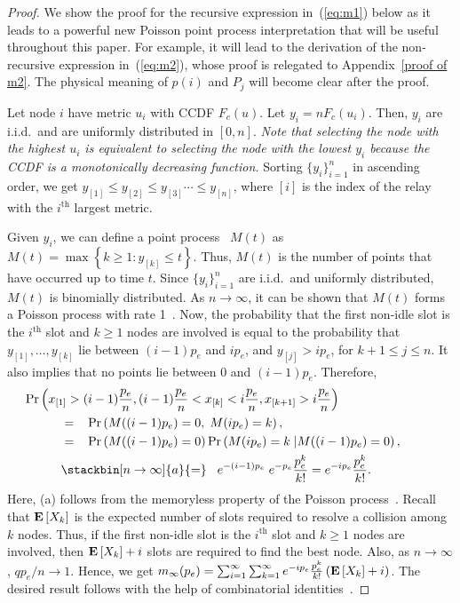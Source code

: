 \documentclass[12pt,draftcls,peerreview, onecolumn]{IEEEtran}
\newcommand{\eqn}[1]{(\ref{#1})}
\newcommand{\brac}[1]{\left({#1}\right)}
\newcommand{\kth}{^{{\mathrm{th}}}}
\newcommand{\tendsto}{\to}
\newcommand{\iid}{{i.i.d.}}
\newcommand{\expect}[1]{{\bf E}\left[{#1}\right]}
\newcommand{\prob}[1]{\text{Pr}\brac{#1}}
\newcommand{\EX}[1]{\expect{X_{#1}}}
\newcommand{\aveslots}[1]{m_{#1}}
\begin{document}
\begin{proof}
  We show the proof for the recursive expression in~\eqn{eq:m1} below
  as it leads to a powerful new Poisson point process interpretation
  that will be useful throughout this paper.  For example, it will
  lead to the derivation of the non-recursive expression
  in~\eqn{eq:m2}, whose proof is relegated to Appendix~\ref{proof of
    m2}. The physical meaning of $p(i)$ and $P_{j}$ will become clear
  after the proof.

  Let node $i$ have metric $u_i$ with CCDF $F_c(u)$. Let $y_i =
  nF_c(u_i)$. Then, $y_i$ are i.i.d.\ and are uniformly distributed in
  $[0,n]$.  {\it Note that selecting the node with the highest $u_{i}$
    is equivalent to selecting the node with the lowest $y_{i}$
    because the CCDF is a monotonically decreasing function.}  Sorting
  $\{y_{i}\}_{i=1}^n$ in ascending order, we get \mbox{$y_{[1]} \le
    y_{[2]} \le y_{[3]} \cdots \le y_{[n]}$}, where $[i]$ is the index of
  the relay with the $i^{\text{th}}$ largest metric.


  Given $y_{i}$, we can define a point process~\cite{wolff} $M(t)$ as
  \mbox{$M(t)=\max{\left\{k\ge1:y_{[k]}\leq t\right\}}$}. Thus, $M(t)$
  is the number of points that have occurred up to time $t$. Since
  $\{y_{i}\}_{i=1}^n$ are \iid\ and uniformly distributed, $M(t)$ is
  binomially distributed.  As $n \to \infty $, it can be shown that
  $M(t)$ forms a Poisson process with rate 1~\cite{wolff}. Now, the
  probability that the first non-idle slot is the $i\kth$ slot and $k
  \ge 1$ nodes are involved is equal to the probability that
  $y_{[1]},\ldots,y_{[k]}$ lie between $(i-1)p_{e}$ and $i p_{e}$, and
  $y_{[j]} > ip_{e}$, for $k+1 \leq j \leq n$.  It also implies that
  no points lie between $0$ and $(i-1)p_{e}$.  Therefore,
\begin{align}
&\hspace{-1cm}\prob{ x_{[1]}>(i-1)\frac{p_e}{n},(i-1)\frac{p_e}{n}<x_{[k]}<i\frac{p_e}{n},x_{[k+1]}>i\frac{p_e}{n}}\nonumber\\
& = \hspace{3mm}\prob{ M((i-1)p_e)=0, \; M(ip_e)=k},\nonumber\\
& = \hspace{3mm}\prob{ M((i-1)p_e)=0 }\prob{ M(ip_e)=k \;|M((i-1)p_e)=0},\nonumber\\
& \stackbin[n \tendsto \infty]{a}{=}  \hspace{3mm} e^{-(i-1)p_e}\; e^{-p_e}\frac{p_e^k}{k!} = e^{-ip_e}\frac{p_e^k}{k!}.
\end{align}
Here, (a) follows from the memoryless property of the Poisson
process~\cite{wolff}.  Recall that $\EX{k}$ is the expected number of
slots required to resolve a collision among $k$ nodes.  Thus, if the
first non-idle slot is the $i\kth$ slot and $k \ge 1$ nodes are
involved, then $\EX{k}+i$ slots are required to find the best node.
Also, as $n\to\infty$, $q p_e/n\to 1$. Hence, we get
$\aveslots{\infty}(p_e) = \sum_{i=1}^\infty\sum_{k=1}^\infty
e^{-ip_e}\frac{p_e^k}{k!} \left(\EX{k}+i\right)$.
The desired
result follows with the help of combinatorial
identities~\cite{gradshteyn00_book}.
\end{proof}
\end{document}
